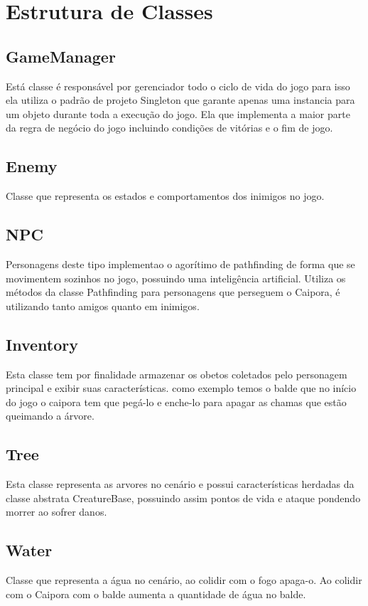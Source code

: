 	
	
	
	\section{Estrutura de Classes}
	
	\subsection{GameManager}
	
Está classe é responsável por gerenciador todo o ciclo de vida do jogo para isso ela  utiliza o padrão de projeto Singleton que garante apenas uma instancia para um objeto durante toda a execução do jogo. Ela que implementa a maior parte da regra de negócio do jogo incluindo condições de vitórias e o fim de jogo.

	\subsection{Enemy}
Classe que representa os estados e comportamentos dos inimigos no jogo.


	\subsection{NPC}
Personagens deste tipo implementao o agorítimo de pathfinding  de forma que  se movimentem sozinhos no jogo, possuindo uma inteligência artificial. Utiliza os métodos da classe Pathfinding para personagens que perseguem o Caipora, é utilizando tanto amigos quanto em inimigos.


	\subsection{Inventory}
Esta classe tem por finalidade armazenar os obetos coletados pelo personagem principal e exibir suas características. como exemplo temos o balde que no início do jogo o caipora tem que pegá-lo e enche-lo para apagar as chamas que estão queimando a árvore.


	\subsection{Tree}
Esta classe representa as arvores no cenário e possui características herdadas da classe abstrata CreatureBase, possuindo assim pontos de vida e ataque pondendo  morrer ao sofrer danos.


	\subsection{Water}
Classe que representa a água no cenário, ao colidir com o fogo apaga-o. Ao colidir com o Caipora com o balde aumenta a quantidade de água no balde.


